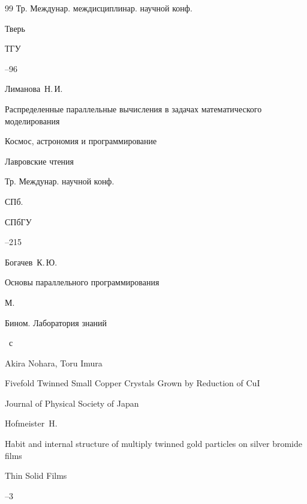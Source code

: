 \begin{thebibliography}{99}
\bookinfo Тр. Междунар. междисциплинар. научной конф.

\publaddr Тверь

\publ ТГУ


--96






\by Лиманова~Н.\,И.

\paper Распределенные параллельные вычисления в задачах математического моделирования

\inbook Космос,  астрономия и программирование

\procinfo Лавровские чтения

\bookinfo Тр. Междунар. научной конф.

\publaddr СПб.

\publ СПбГУ


--215




\by Богачев~К.\,Ю.

\book Основы параллельного программирования

\publaddr М.

\publ Бином. Лаборатория знаний


~с




\by Akira Nohara,  Toru Imura

\paper Fivefold Twinned Small Copper Crystals Grown by Reduction of CuI

\jour Journal of Physical Society of Japan








\by Hofmeister~H.

\paper Habit and internal structure of multiply twinned gold particles on silver bromide films

\jour Thin Solid Films



--3


\end{thebibliography}
